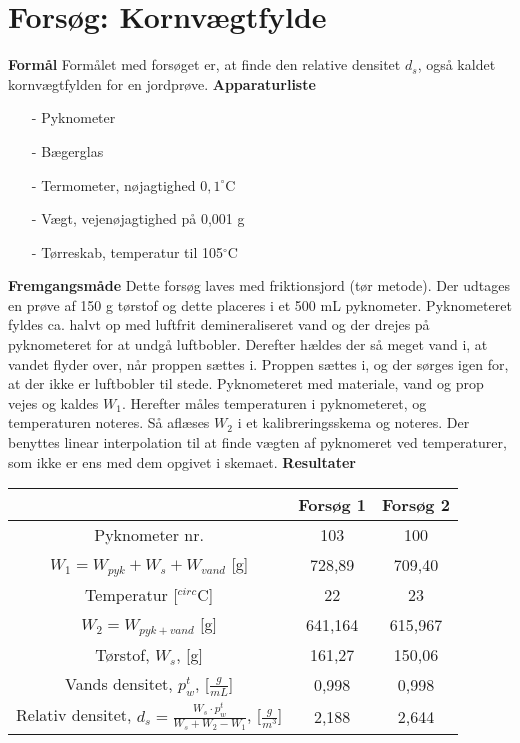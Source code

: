 \chapter{Forsøg: Kornvægtfylde}
\textbf{Formål}
\newline
Formålet med forsøget er, at finde den relative densitet $d_{s}$, også kaldet kornvægtfylden for en jordprøve. 
\newline
\newline
\textbf{Apparaturliste}
\begin{itemize}
\item[-] Pyknometer
\item[-] Bægerglas
\item[-] Termometer, nøjagtighed $0,1^{\circ}$C
\item[-] Vægt, vejenøjagtighed på 0,001 g
\item[-] Tørreskab, temperatur til 105$^{\circ}$C
\end{itemize}

\textbf{Fremgangsmåde}
\newline
Dette forsøg laves med friktionsjord (tør metode). Der udtages en prøve af 150 g tørstof og dette placeres i et 500 mL pyknometer. Pyknometeret fyldes ca. halvt op med luftfrit demineraliseret vand og der drejes på pyknometeret for at undgå luftbobler. Derefter hældes der så meget vand i, at vandet flyder over, når proppen sættes i. Proppen sættes i, og der sørges igen for, at der ikke er luftbobler til stede. Pyknometeret med materiale, vand og prop vejes og kaldes $W_{1}$. Herefter måles temperaturen i pyknometeret, og temperaturen noteres. Så aflæses $W_{2}$ i et kalibreringsskema og noteres. Der benyttes linear interpolation til at finde vægten af pyknomeret ved temperaturer, som ikke er ens med dem opgivet i skemaet. 
\newline
\newline
\textbf{Resultater}
\begin{center}
	\begin{tabular}{ |c|c|c| } 
		\hline
		 & Forsøg 1 & Forsøg 2 \\	\hline
		Pyknometer nr. & 103 & 100 \\	\hline
		$W_1=W_{pyk} + W_s + W_{vand}$ [g] & 728,89 & 709,40 \\	\hline 
		Temperatur [$^{circ}$C] & 22 & 23 \\ \hline
		$W_2=W_{pyk+vand}$ [g] & 641,164 & 615,967 \\	\hline
		Tørstof, $W_s$, [g] & 161,27 & 150,06 \\	\hline
		Vands densitet, $p_{w}^t$, [$\frac{g}{mL}$] & 0,998 & 0,998 \\	\hline
		Relativ densitet, $d_s=\frac{W_s\cdot p_{w}^t}{W_s + W_2 - W_1}$, [$\frac{g}{m^3}$] & 2,188 & 2,644		
	\end{tabular}
\end{center}


